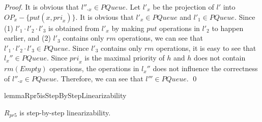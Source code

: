 \documentclass{llncs}
\begin{document}
\begin {proof}
It is obvious that $l''_{\textit{-x}} \in \textit{PQueue}$. Let $l'_x$ be the projection of $l'$ into $\textit{OP}_x - \{ \textit{put}(x,\textit{pri}_x) \}$. It is obvious that $l'_x \in \textit{PQueue}$ and $l'_1 \in \textit{PQueue}$. Since (1) $l'_1 \cdot l'_2 \cdot l'_3$ is obtained from $l'_x$ by making $\textit{put}$ operations in $l'_2$ to happen earlier, and (2) $l'_3$ contains only $\textit{rm}$ operations, we can see that $l'_1 \cdot l'_2 \cdot l'_3 \in \textit{PQueue}$. Since $l'_3$ contains only $\textit{rm}$ operations, it is easy to see that $l_x'' \in \textit{PQueue}$. Since $\textit{pri}_x$ is the maximal priority of $h$ and $h$ does not contain $\textit{rm}(\textit{Empty})$ operations, the operations in $l_x''$ does not influence the correctness of $l''_{\textit{-x}} \in \textit{PQueue}$. Therefore, we can see that $l''' \in \textit{PQueue}$. \qed
\end {proof}




\begin{restatable}{lemma}{Rpr5isStepByStepLinearizability}
\label{lemma:Rpr5 is step-by-step linearizability}

$R_{\textit{pr5}}$ is step-by-step linearizability.

\end{restatable}
\end{document}
